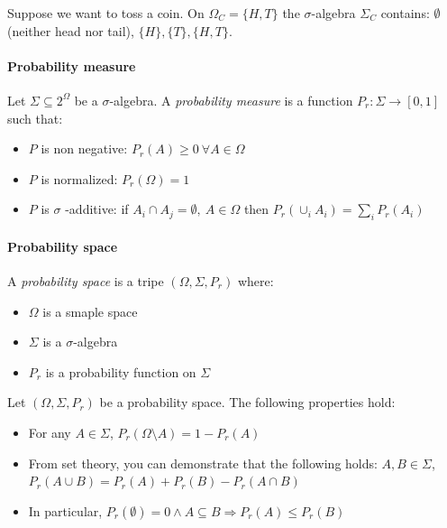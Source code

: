 \documentclass{article}
\begin{document}
Suppose we want to toss a coin. On \(\Omega_C = \{H, T\}\) the
\(\sigma\)-algebra \(\Sigma_C\) contains: \(\emptyset\) (neither head
nor tail), \(\{H\}, \{T\}, \{H,
T\}\).

\paragraph{Probability measure}\label{probability-measure}

Let \(\Sigma \subseteq 2^{\Omega}\) be a \(\sigma\)-algebra. A
\emph{probability measure} is a function
\(P_r: \Sigma \rightarrow [0, 1]\) such that:

\begin{itemize}
\tightlist
\item
  \(P\) is non negative: \(P_r(A)\ge 0\ \forall A\in \Omega\)
\item
  \(P\) is normalized: \(P_r(\Omega)=1\)
\item
  \(P\) is \(\sigma\) -additive: if
  \(A_i \cap A_j = \emptyset,\ A\in \Omega\) then
  \(P_r(\cup_i A_i)=\sum_i P_r(A_i)\)
\end{itemize}

\paragraph{Probability space}\label{probability-space}

A \emph{probability space} is a tripe \((\Omega, \Sigma, P_r)\) where:

\begin{itemize}
\item
  \(\Omega\) is a smaple space
\item
  \(\Sigma\) is a \(\sigma\)-algebra
\item
  \(P_r\) is a probability function on \(\Sigma\)
\end{itemize}

Let \((\Omega, \Sigma, P_r)\) be a probability space. The following
properties hold:

\begin{itemize}
\item
  For any \(A \in \Sigma\), \(P_r(\Omega \setminus A) = 1 - P_r(A)\)
\item
  From set theory, you can demonstrate that the following holds:
  \(A, B \in
  \Sigma\), \(P_r(A \cup B) = P_r(A) + P_r(B) - P_r(A \cap B)\)
\item
  In particular,
  \(P_r(\emptyset ) = 0 \land A \subseteq B \Rightarrow P_r(A) \le
  P_r(B)\)
\end{itemize}
\end{document}
